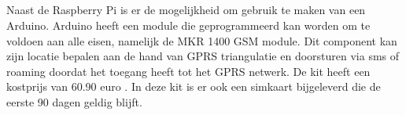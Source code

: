 \subsection{}
Naast de Raspberry Pi is er de mogelijkheid om gebruik te maken van een Arduino. Arduino heeft een module die geprogrammeerd kan worden om te voldoen aan alle eisen, namelijk de MKR 1400 GSM module. Dit component kan zijn locatie bepalen aan de hand van GPRS triangulatie en doorsturen via sms of roaming doordat het toegang heeft tot het GPRS netwerk. De kit heeft een kostprijs van 60.90 euro \autocite{arduino}. In deze kit is er ook een simkaart bijgeleverd die de eerste 90 dagen geldig blijft.